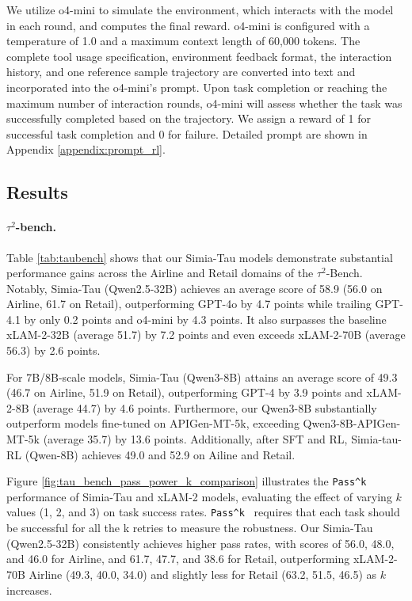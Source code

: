 We utilize o4-mini to simulate the environment, which interacts with the model in each round, and computes the final reward. o4-mini is configured with a temperature of 1.0 and a maximum context length of 60,000 tokens. The complete tool usage specification, environment feedback format, the interaction history, and one reference sample trajectory are converted into text and incorporated into the o4-mini's prompt. 
Upon task completion or reaching the maximum number of interaction rounds, o4-mini will assess whether the task was successfully completed based on the trajectory. We assign a reward of 1 for successful task completion and 0 for failure. Detailed prompt are shown in Appendix \ref{appendix:prompt_rl}.


\subsection{Results}


\paragraph{$\tau^2$-bench.}
Table \ref{tab:taubench} shows that our Simia-Tau models demonstrate substantial performance gains across the Airline and Retail domains of the $\tau^2$-Bench. Notably, Simia-Tau (Qwen2.5-32B) achieves an average score of 58.9 (56.0 on Airline, 61.7 on Retail), outperforming GPT-4o by 4.7 points while trailing GPT-4.1 by only 0.2 points and o4-mini by 4.3 points. It also surpasses the baseline xLAM-2-32B (average 51.7) by 7.2 points and even exceeds xLAM-2-70B (average 56.3) by 2.6 points.






For 7B/8B-scale models, Simia-Tau (Qwen3-8B) attains an average score of 49.3 (46.7 on Airline, 51.9 on Retail), outperforming GPT-4 by 3.9 points and xLAM-2-8B (average 44.7) by 4.6 points. Furthermore, our Qwen3-8B substantially outperform models fine-tuned on APIGen-MT-5k, exceeding Qwen3-8B-APIGen-MT-5k (average 35.7) by 13.6 points. Additionally, after SFT and RL, Simia-tau-RL (Qwen-8B) achieves 49.0 and 52.9 on Ailine and Retail. 


Figure \ref{fig:tau_bench_pass_power_k_comparison} illustrates the \verb|Pass^k|~\citep{barres2025tau} performance of Simia-Tau and xLAM-2 models, evaluating the effect of varying $k$ values (1, 2, and 3) on task success rates. \verb|Pass^k|~\citep{barres2025tau} requires that each task should be successful for all the k retries to measure the robustness. Our Simia-Tau (Qwen2.5-32B) consistently achieves higher pass rates, with scores of 56.0, 48.0, and 46.0 for Airline, and 61.7, 47.7, and 38.6 for Retail, outperforming xLAM-2-70B Airline (49.3, 40.0, 34.0) and slightly less for Retail (63.2, 51.5, 46.5) as $k$ increases. 

